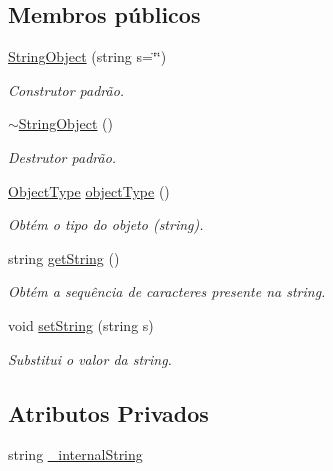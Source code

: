 \subsection*{Membros públicos}
\begin{DoxyCompactItemize}
\item 
\hyperlink{classStringObject_af29d58fcfbd76c7708e5c8689321ab32}{String\+Object} (string s=\char`\"{}\char`\"{})
\begin{DoxyCompactList}\small\item\em Construtor padrão. \end{DoxyCompactList}\item 
\hyperlink{classStringObject_a7db6683d04fe432e570458daf305500b}{$\sim$\+String\+Object} ()
\begin{DoxyCompactList}\small\item\em Destrutor padrão. \end{DoxyCompactList}\item 
\hyperlink{BasicTypes_8h_a842c5e2e69277690b064bf363c017980}{Object\+Type} \hyperlink{classStringObject_a7d89db7df43b17354baf5337edd636b7}{object\+Type} ()
\begin{DoxyCompactList}\small\item\em Obtém o tipo do objeto (string). \end{DoxyCompactList}\item 
string \hyperlink{classStringObject_aedd2df1630c9b291ea17407b3f626573}{get\+String} ()
\begin{DoxyCompactList}\small\item\em Obtém a sequência de caracteres presente na string. \end{DoxyCompactList}\item 
void \hyperlink{classStringObject_a96812d8ef025b1f897b09f816d0297f7}{set\+String} (string s)
\begin{DoxyCompactList}\small\item\em Substitui o valor da string. \end{DoxyCompactList}\end{DoxyCompactItemize}
\subsection*{Atributos Privados}
\begin{DoxyCompactItemize}
\item 
string \hyperlink{classStringObject_a129b52ebca78da26c58175e45e1869cc}{\+\_\+internal\+String}
\end{DoxyCompactItemize}


